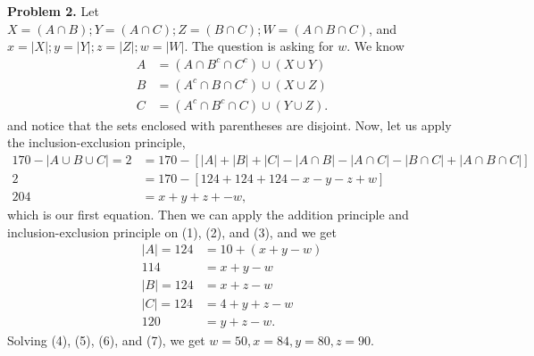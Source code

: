 \documentclass{article}
\begin{document}
\textbf{Problem 2.}
Let $X = (A\cap B); Y=(A\cap C);Z=(B \cap C);W=(A\cap B\cap C)$, and $x=|X|;y=|Y|;z=|Z|;w=|W|$.
The question is asking for $w$.
We know 
\begin{align}
    A & = (A\cap B^c\cap C^c)\cup (X\cup Y) \\
    B & = (A^c\cap B\cap C^c)\cup (X\cup Z) \\
    C & = (A^c\cap B^c\cap C)\cup (Y\cup Z).
\end{align}
and notice that the sets enclosed with parentheses are disjoint. Now, let us apply the inclusion-exclusion principle,
\begin{align}
    170-|A\cup B\cup C| = 2 & = 170 - \left[|A|+|B|+|C|-|A\cap B|-|A\cap C|-|B\cap C|+|A\cap B\cap C|\right] \nonumber \\
    2 & = 170 - \left[124+124+124-x-y-z+w\right] \nonumber \\
    204 & = x+y+z+-w,
\end{align}
which is our first equation. Then we can apply the addition principle and inclusion-exclusion principle on (1), (2), and (3), and we get 
\begin{align}
    |A| = 124 & = 10+(x+y-w) \nonumber\\
    114 & = x+y-w \\
    |B| = 124 & = x+z-w \\
    |C| = 124 & = 4+y+z-w \nonumber\\
    120&=y+z-w.
\end{align}
Solving (4), (5), (6), and (7), we get $w=50, x=84, y=80, z=90$.
\bigbreak
\end{document}
